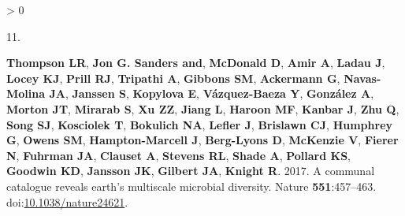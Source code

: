 \documentclass[
]{article}
\newlength{\cslhangindent}
\newlength{\csllabelwidth}
\newenvironment{CSLReferences}[3] %
 {%
  \setlength{\parindent}{0pt}
  \ifodd #1 \everypar{\setlength{\hangindent}{\cslhangindent}}\ignorespaces\fi
  \ifnum #2 > 0
  \setlength{\parskip}{#2\baselineskip}
  \fi
 }%
 {}
\newcommand{\CSLLeftMargin}[1]{\parbox[t]{\csllabelwidth}{#1}}
\newcommand{\CSLRightInline}[1]{\parbox[t]{\linewidth - \csllabelwidth}{#1}}
\begin{document}
\begin{CSLReferences}{0}{0}
\leavevmode\hypertarget{ref-Thompson2017}{}%
\CSLLeftMargin{11. }
\CSLRightInline{\textbf{Thompson LR}, \textbf{Jon G. Sanders and},
\textbf{McDonald D}, \textbf{Amir A}, \textbf{Ladau J}, \textbf{Locey
KJ}, \textbf{Prill RJ}, \textbf{Tripathi A}, \textbf{Gibbons SM},
\textbf{Ackermann G}, \textbf{Navas-Molina JA}, \textbf{Janssen S},
\textbf{Kopylova E}, \textbf{Vázquez-Baeza Y}, \textbf{González A},
\textbf{Morton JT}, \textbf{Mirarab S}, \textbf{Xu ZZ}, \textbf{Jiang
L}, \textbf{Haroon MF}, \textbf{Kanbar J}, \textbf{Zhu Q}, \textbf{Song
SJ}, \textbf{Kosciolek T}, \textbf{Bokulich NA}, \textbf{Lefler J},
\textbf{Brislawn CJ}, \textbf{Humphrey G}, \textbf{Owens SM},
\textbf{Hampton-Marcell J}, \textbf{Berg-Lyons D}, \textbf{McKenzie V},
\textbf{Fierer N}, \textbf{Fuhrman JA}, \textbf{Clauset A},
\textbf{Stevens RL}, \textbf{Shade A}, \textbf{Pollard KS},
\textbf{Goodwin KD}, \textbf{Jansson JK}, \textbf{Gilbert JA},
\textbf{Knight R}. 2017. A communal catalogue reveals earth's multiscale
microbial diversity. Nature \textbf{551}:457--463.
doi:\href{https://doi.org/10.1038/nature24621}{10.1038/nature24621}.}


\end{CSLReferences}
\end{document}
